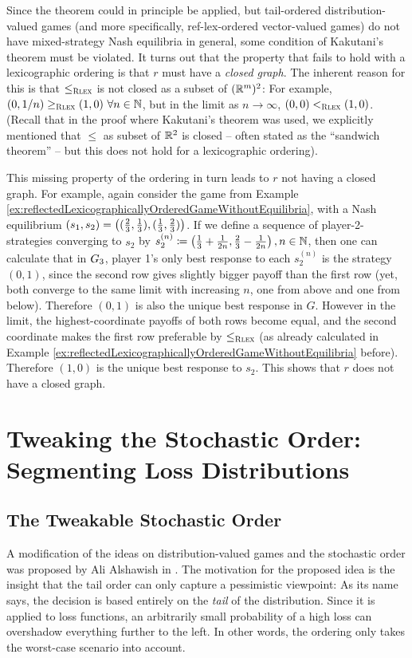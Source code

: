 \documentclass[a4paper,DIV=11,abstracton,twoside=semi]{scrreprt}
\theoremstyle{definition}
\begin{document}
    Since the theorem could in principle be applied, but tail-ordered distribution-valued games (and more specifically, ref-lex-ordered vector-valued games) do not have mixed-strategy Nash equilibria in general, some condition of Kakutani's theorem must be violated. 
    It turns out that the property that fails to hold with a lexicographic ordering is that $r$ must have a \emph{closed graph}.
    The inherent reason for this is that $\leq_{\textsc{Rlex}}$ is not closed as a subset of $(\mathbb{R}^m)^2$:
    For example, $(0, 1/n) \geq_{\textsc{Rlex}} (1, 0) ~ \forall n \in \mathbb{N}$, but in the limit as $n \to \infty$, $(0, 0) <_{\textsc{Rlex}} (1, 0)$.
    (Recall that in the proof where Kakutani's theorem was used, we explicitly mentioned that $\leq$ as subset of $\mathbb{R}^2$ is closed -- often stated as the “sandwich theorem” -- but this does not hold for a lexicographic ordering).
    
    This missing property of the ordering in turn leads to $r$ not having a closed graph. For example, again consider the game from Example \ref{ex:reflectedLexicographicallyOrderedGameWithoutEquilibria}, with a Nash equilibrium $(s_1, s_2) = \left((\frac{2}{3}, \frac{1}{3}), (\frac{1}{3}, \frac{2}{3})\right)$.
    If we define a sequence of player-2-strategies converging to $s_2$ by $s_2^{(n)} \coloneqq \left(\frac{1}{3} + \frac{1}{2n}, \frac{2}{3} - \frac{1}{2n}\right), n \in \mathbb{N}$, then one can calculate that in $G_{3}$, player 1's only best response to each $s_2^{(n)}$ is the strategy $(0, 1)$, since the second row gives slightly bigger payoff than the first row (yet, both converge to the same limit with increasing $n$, one from above and one from below). Therefore $(0, 1)$ is also the unique best response in $G$.
    However in the limit, the highest-coordinate payoffs of both rows become equal, and the second coordinate makes the first row preferable by $\leq_{\textsc{Rlex}}$ (as already calculated in Example \ref{ex:reflectedLexicographicallyOrderedGameWithoutEquilibria} before). Therefore $(1, 0)$ is the unique best response to $s_2$. This shows that $r$ does not have a closed graph.
    
    \chapter{Tweaking the Stochastic Order: Segmenting Loss Distributions}
    \label{chap:segmentingLossDistributions}
    
    \section{The Tweakable Stochastic Order}
    A modification of the ideas on distribution-valued games and the stochastic order was proposed by Ali Alshawish in \cite{bib:tweakableStochasticOrders}.
    The motivation for the proposed idea is the insight that the tail order can only capture a pessimistic viewpoint: As its name says, the decision is based entirely on the \emph{tail} of the distribution. Since it is applied to loss functions, an arbitrarily small probability of a high loss can overshadow everything further to the left. In other words, the ordering only takes the worst-case scenario into account.
        
\end{document}
